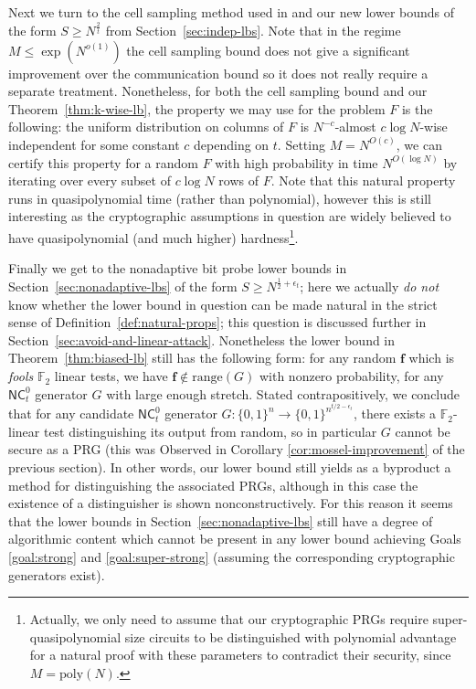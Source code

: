 \documentclass[11pt]{article}
\newcommand{\B}{\{0,1\}}
\newcommand{\rng}{\mathrm{range}}
\newcommand{\poly}{\mathrm{poly}}
\begin{document}
Next we turn to the cell sampling method used in \cite{Siegel89,Siegel04,panigrahy,kasper} and our new lower bounds of the form $S \geq N^{\frac{2}{t}}$ from Section~\ref{sec:indep-lbs}. Note that in the regime $M \leq \exp(N^{o(1)})$ the cell sampling bound does not give a significant improvement over the communication bound so it does not really require a separate treatment. Nonetheless, for both the cell sampling bound and our Theorem~\ref{thm:k-wise-lb}, the property we may use for the problem $F$ is the following: the uniform distribution on columns of $F$ is $N^{-c}$-almost $c\log N$-wise independent for some constant $c$ depending on $t$. Setting $M = N^{O(c)}$, we can certify this property for a random $F$ with high probability in time $N^{O(\log N)}$ by iterating over every subset of $c \log N$ rows of $F$. Note that this natural property runs in quasipolynomial time (rather than polynomial), however this is still interesting as the cryptographic assumptions in question are widely believed to have quasipolynomial (and much higher) hardness\footnote{Actually, we only need to assume that our cryptographic PRGs require super-quasipolynomial size circuits to be distinguished with polynomial advantage for a natural proof with these parameters to contradict their security, since $M = \poly(N)$.}.

Finally we get to the nonadaptive bit probe lower bounds in Section~\ref{sec:nonadaptive-lbs} of the form $S \geq N^{\frac{1}{2} + \epsilon_t}$; here we actually \emph{do not} know whether the lower bound in question can be made natural in the strict sense of Definition~\ref{def:natural-props}; this question is discussed further in Section~\ref{sec:avoid-and-linear-attack}. 
Nonetheless the lower bound in Theorem~\ref{thm:biased-lb} still has the following form: for any random $\bm{f}$ which is \emph{fools} $\mathbb{F}_2$ linear tests, we have $\bm{f} \notin \rng(G)$ with nonzero probability, for any $\mathsf{NC}^0_t$ generator $G$ with large enough stretch. Stated contrapositively, we conclude that for any candidate $\mathsf{NC}^0_t$ generator $G: \B^n \to \B^{n^{t/2-\epsilon_t}}$, there exists a $\mathbb{F}_2$-linear test distinguishing its output from random, so in particular $G$ cannot be secure as a PRG (this was Observed in Corollary \ref{cor:mossel-improvement} of the previous section). In other words, our lower bound still yields as a byproduct a method for distinguishing the associated PRGs, although in this case the existence of a distinguisher is shown nonconstructively.
For this reason it seems that the lower bounds in Section~\ref{sec:nonadaptive-lbs} still have a degree of algorithmic content which cannot be present in any lower bound achieving Goals \ref{goal:strong} and \ref{goal:super-strong} (assuming the corresponding cryptographic generators exist). 
\end{document}
